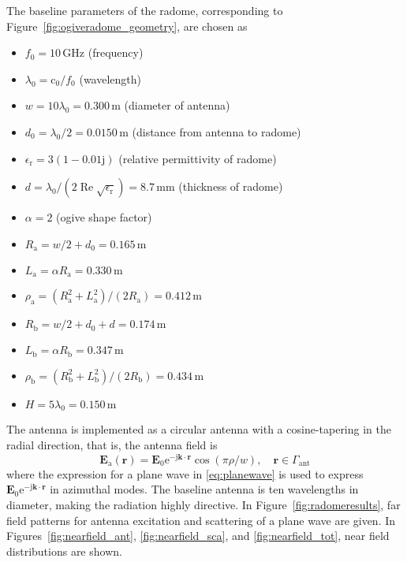 \documentclass[a4paper,12pt]{article}
\renewcommand{\vec}[1]{\boldsymbol{#1}}
\newcommand{\mrm}[1]{\mathrm{#1}}
\newcommand{\unit}[1]{\ensuremath{\,\mrm{#1}}}
\renewcommand{\Re}{\operatorname{Re}}
\newcommand{\ju}{\mrm{j}}
\newcommand{\eu}{\mrm{e}}
\newcommand{\cu}{\mrm{c}_{0}}
\newcommand{\Ev}{\vec{E}}
\newcommand{\rv}{\vec{r}}
\newcommand{\kv}{\vec{k}}
\begin{document}
The baseline parameters of the radome, corresponding to
Figure~\ref{fig:ogiveradome_geometry}, are chosen as
\begin{itemize}
\item $f_{0} = 10\unit{GHz}$ (frequency)
\item $\lambda_{0} = \cu/f_{0}$ (wavelength)
\item $w = 10\lambda_{0} = 0.300\unit{m}$ (diameter of antenna)
\item $d_{0} = \lambda_{0}/2 = 0.0150\unit{m}$ (distance from antenna to radome)
\item $\epsilon_{\mrm{r}} = 3(1-0.01\ju)$ (relative permittivity of radome)
\item $d = \lambda_{0}/(2\Re\sqrt{\epsilon_{\mrm{r}}}) = 8.7\unit{mm}$
  (thickness of radome)
\item $\alpha = 2$ (ogive shape factor)
\item $R_{\mrm{a}} = w/2 + d_{0} = 0.165\unit{m}$
\item $L_{\mrm{a}} = \alpha R_{\mrm{a}} = 0.330\unit{m}$
\item $\rho_{\mrm{a}} = (R_{\mrm{a}}^{2} + L_{\mrm{a}}^{2})/(2R_{\mrm{a}}) = 0.412\unit{m}$
\item $R_{\mrm{b}} = w/2 + d_{0} + d = 0.174\unit{m}$
\item $L_{\mrm{b}} = \alpha R_{\mrm{b}} = 0.347\unit{m}$
\item $\rho_{\mrm{b}} = (R_{\mrm{b}}^{2} + L_{\mrm{b}}^{2})/(2R_{\mrm{b}}) = 0.434\unit{m}$
\item $H = 5\lambda_{0} = 0.150\unit{m}$
\end{itemize}
The antenna is implemented as a circular antenna with a
cosine-tapering in the radial direction, that is, the antenna field is
\begin{equation}
  \Ev_{\mrm{a}}(\rv) = \Ev_{0}\eu^{-\ju\kv\cdot\rv}\cos(\pi\rho/w), \quad \rv\in\Gamma_{\mrm{ant}}
\end{equation}
where the expression for a plane wave in \eqref{eq:planewave} is used
to express $\Ev_{0}\eu^{-\ju\kv\cdot\rv}$ in azimuthal modes. The
baseline antenna is ten wavelengths in diameter, making the radiation
highly directive. In Figure~\ref{fig:radomeresults}, far field
patterns for antenna excitation and scattering of a plane wave are
given. In Figures~\ref{fig:nearfield_ant}, \ref{fig:nearfield_sca},
and \ref{fig:nearfield_tot}, near field distributions are shown.
\end{document}
